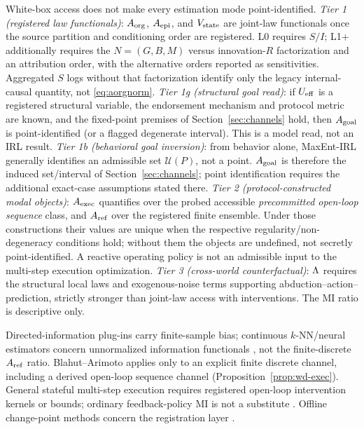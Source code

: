 \begin{proposition}
\label{prop:whitebox}
White-box access does not make every estimation mode point-identified.
\emph{Tier 1 (registered law functionals)}: $A_{\mathrm{org}}$, $A_{\mathrm{epi}}$, and $V_{\mathrm{state}}$ are
joint-law functionals once the source partition and conditioning order are
registered. L0 requires $S/I$; L1+ additionally requires the $N=(G,B,M)$ versus
innovation-$R$ factorization and an attribution order, with the alternative
orders reported as sensitivities. Aggregated $S$ logs without that factorization identify only
the legacy internal-causal quantity, not \eqref{eq:aorgnorm}.
\emph{Tier 1g (structural goal read)}: if $U_{\mathrm{eff}}$ is a registered structural
variable, the endorsement mechanism and protocol metric are known, and the
fixed-point premises of Section~\ref{sec:channels} hold, then $A_{\mathrm{goal}}$ is
point-identified (or a flagged degenerate interval). This is a model read,
not an IRL result.
\emph{Tier 1b (behavioral goal inversion)}: from behavior alone, MaxEnt-IRL
generally identifies an admissible set $\mathcal U(P)$, not a point. $A_{\mathrm{goal}}$
is therefore the induced set/interval of Section~\ref{sec:channels}; point
identification requires the additional exact-case assumptions stated there.
\emph{Tier 2 (protocol-constructed modal objects)}: $A_{\mathrm{exec}}$ quantifies over
the probed accessible \emph{precommitted open-loop sequence} class, and
$A_{\mathrm{ref}}$ over the registered finite ensemble. Under those constructions their
values are unique when the respective regularity/non-degeneracy conditions
hold; without them the objects are undefined, not secretly point-identified.
A reactive operating policy is not an admissible input to the multi-step
execution optimization.
\emph{Tier 3 (cross-world counterfactual)}: $\Lambda$ requires the structural
local laws and exogenous-noise terms supporting abduction--action--prediction,
strictly stronger than joint-law access with interventions. The MI ratio is
descriptive only.

Directed-information plug-ins carry finite-sample bias; continuous
$k$-NN/neural estimators concern unnormalized information functionals
\citep{kraskov2004,belghazi2018}, not the finite-discrete $A_{\mathrm{ref}}$ ratio.
Blahut--Arimoto applies only to an explicit finite discrete channel, including
a derived open-loop sequence channel (Proposition~\ref{prop:wd-exec}). General
stateful multi-step execution requires registered open-loop intervention
kernels or bounds; ordinary feedback-policy MI is not a substitute
\citep{mohamed2015,cover_thomas2006}. Offline change-point methods concern the
registration layer \citep{truong2020,salge2013}.
\end{proposition}

